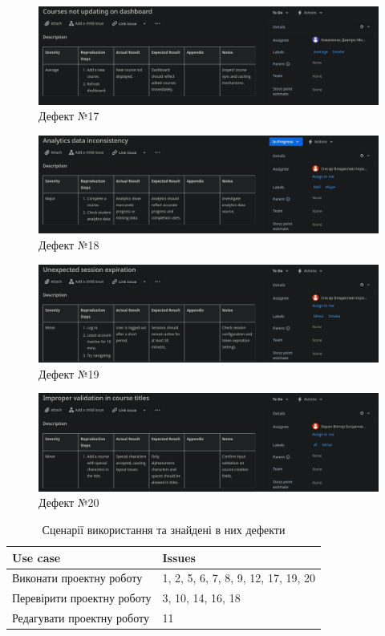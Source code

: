 \documentclass[oneside,14pt]{extarticle}
\begin{document}
\begin{normalsize}
	\begin{figure}[H]
		\centering
		\includegraphics[width=\columnwidth]{18}
		\caption{Дефект №17}
	\end{figure}
	
	\begin{figure}[H]
		\centering
		\includegraphics[width=\columnwidth]{19}
		\caption{Дефект №18}
	\end{figure}
		
	\begin{figure}[H]
		\centering
		\includegraphics[width=\columnwidth]{20}
		\caption{Дефект №19}
	\end{figure}
	
	\begin{figure}[H]
		\centering
		\includegraphics[width=\columnwidth]{21}
		\caption{Дефект №20}
	\end{figure}
	
	\begin{longtable}{|p{5cm}|p{5cm}|}
		\caption{Сценарії використання та знайдені в них дефекти}
		\\\hline
		Use case & Issues
		\\\hline
		Виконати проектну роботу & 1, 2, 5, 6, 7, 8, 9, 12, 17, 19, 20
		\\\hline
		Перевірити проектну роботу & 3, 10, 14, 16, 18
		\\\hline
		Редагувати проектну роботу & 11
		\\\hline
	\end{longtable}
	

\end{normalsize}
\end{document}
